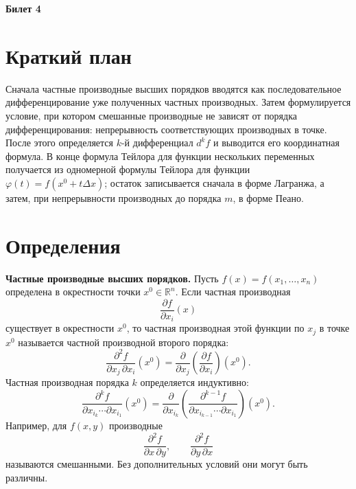 \documentclass[12pt,a4paper]{article}
\newcommand{\R}{\mathbb{R}}
\newcommand{\Dx}{\Delta x}
\begin{document}
\begin{center}
{\Large\bfseries Билет 4}
\end{center}

\noindent{}

\section*{Краткий план}

Сначала частные производные высших порядков вводятся как последовательное
дифференцирование уже полученных частных производных. Затем формулируется
условие, при котором смешанные производные не зависят от порядка
дифференцирования: непрерывность соответствующих производных в точке. После
этого определяется \(k\)-й дифференциал \(d^k f\) и выводится его координатная
формула. В конце формула Тейлора для функции нескольких переменных получается
из одномерной формулы Тейлора для функции
\(\varphi(t)=f(x^0+t\Dx)\); остаток записывается сначала в форме Лагранжа, а
затем, при непрерывности производных до порядка \(m\), в форме Пеано.

\section*{Определения}

\textbf{Частные производные высших порядков.}
Пусть \(f(x)=f(x_1,\dots,x_n)\) определена в окрестности точки
\(x^0\in\R^n\). Если частная производная
\[
  \frac{\partial f}{\partial x_i}(x)
\]
существует в окрестности \(x^0\), то частная производная этой функции по
\(x_j\) в точке \(x^0\) называется частной производной второго порядка:
\[
  \frac{\partial^2 f}{\partial x_j\,\partial x_i}(x^0)
  =
  \frac{\partial}{\partial x_j}
  \left(\frac{\partial f}{\partial x_i}\right)(x^0).
\]
Частная производная порядка \(k\) определяется индуктивно:
\[
  \frac{\partial^k f}
       {\partial x_{i_k}\cdots\partial x_{i_1}}(x^0)
  =
  \frac{\partial}{\partial x_{i_k}}
  \left(
    \frac{\partial^{k-1}f}
         {\partial x_{i_{k-1}}\cdots\partial x_{i_1}}
  \right)(x^0).
\]
Например, для \(f(x,y)\) производные
\[
  \frac{\partial^2 f}{\partial x\,\partial y},
  \qquad
  \frac{\partial^2 f}{\partial y\,\partial x}
\]
называются смешанными. Без дополнительных условий они могут быть различны.
\end{document}
